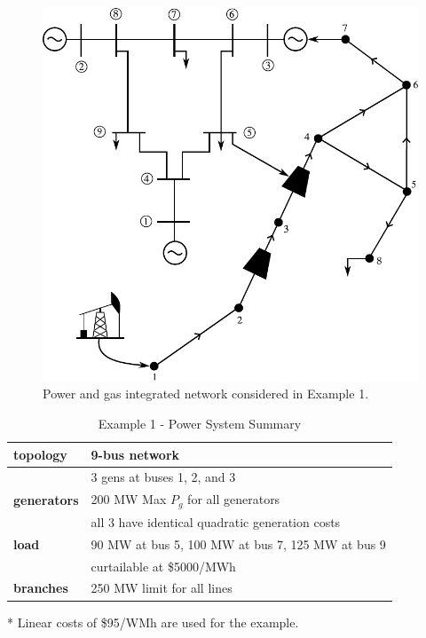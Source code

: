 \begin{figure}[!ht]
	\centering
	\includegraphics[scale=0.8]{Figures/Example1}
	\caption{Power and gas integrated network considered in Example 1.}
	\label{fig:example1}
\end{figure}


\begin{table}[!ht]
\centering
\begin{threeparttable}
\caption{Example 1 - Power System Summary}
\label{tab:ex1_power}
\footnotesize
\begin{tabular}{ll}
\toprule
\bf{topology}	& 9-bus network	 \\
\midrule
			& 3 gens at buses 1, 2, and 3\\
\bf{generators}	& 200 MW Max $P_{g}$ for all generators\\
			& all 3 have identical quadratic generation costs \tnote{*}\\
\midrule
\bf{load}		& 90 MW at bus 5, 100 MW at bus 7, 125 MW at bus 9 \\
			& curtailable at \$5000/MWh	\\
\midrule
\bf{branches}	& 250 MW limit for all lines	\\
\bottomrule
\end{tabular}
\begin{tablenotes}
 \scriptsize
 \item [*] {Linear costs of \$95/WMh are used for the example.}
\end{tablenotes}
\end{threeparttable}
\end{table}


